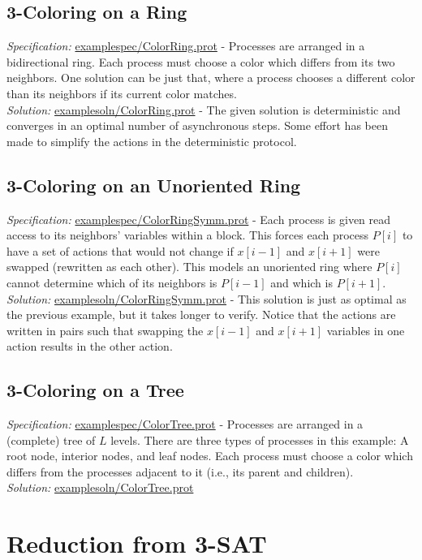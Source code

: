 \subsection{3-Coloring on a Ring}

\textit{Specification:} \url{examplespec/ColorRing.prot}
- Processes are arranged in a bidirectional ring.
Each process must choose a color which differs from its two neighbors.
One solution can be just that, where a process chooses a different color than its neighbors if its current color matches.
\\\textit{Solution:} \url{examplesoln/ColorRing.prot}
- The given solution is deterministic and converges in an optimal number of asynchronous steps.
Some effort has been made to simplify the actions in the deterministic protocol.

\subsection{3-Coloring on an Unoriented Ring}

\textit{Specification:} \url{examplespec/ColorRingSymm.prot}
- Each process is given read access to its neighbors' variables within a  block.
This forces each process $P[i]$ to have a set of actions that would not change if $x[i-1]$ and $x[i+1]$ were swapped (rewritten as each other).
This models an unoriented ring where $P[i]$ cannot determine which of its neighbors is $P[i-1]$ and which is $P[i+1]$.
\\\textit{Solution:} \url{examplesoln/ColorRingSymm.prot}
- This solution is just as optimal as the previous example, but it takes longer to verify.
Notice that the actions are written in pairs such that swapping the $x[i-1]$ and $x[i+1]$ variables in one action results in the other action.

\subsection{3-Coloring on a Tree}
\textit{Specification:} \url{examplespec/ColorTree.prot}
- Processes are arranged in a (complete) tree of $L$ levels.
There are three types of processes in this example: A root node, interior nodes, and leaf nodes.
Each process must choose a color which differs from the processes adjacent to it (i.e., its parent and children).
\\\textit{Solution:} \url{examplesoln/ColorTree.prot}

\section{Reduction from 3-SAT}

